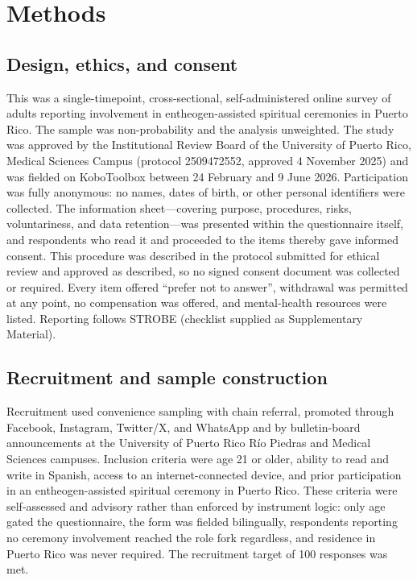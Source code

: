\documentclass[12pt]{article}
\begin{document}
\section{Methods}

\subsection{Design, ethics, and consent}

This was a single-timepoint, cross-sectional, self-administered online survey of adults reporting
involvement in entheogen-assisted spiritual ceremonies in Puerto Rico. The sample was non-probability and
the analysis unweighted. The study was approved by the Institutional Review Board of the University of
Puerto Rico, Medical Sciences Campus (protocol 2509472552, approved 4 November 2025) and was fielded on
KoboToolbox between 24 February and 9 June 2026. Participation was fully anonymous: no names, dates of
birth, or other personal identifiers were collected. The information sheet---covering purpose, procedures,
risks, voluntariness, and data retention---was presented within the questionnaire itself, and respondents
who read it and proceeded to the items thereby gave informed consent. This procedure was described in the
protocol submitted for ethical review and approved as described, so no signed consent document was
collected or required. Every item offered ``prefer not to answer'', withdrawal was permitted at any point,
no compensation was offered, and mental-health resources were listed. Reporting follows STROBE (checklist
supplied as Supplementary Material).

\subsection{Recruitment and sample construction}

Recruitment used convenience sampling with chain referral, promoted through Facebook, Instagram, Twitter/X,
and WhatsApp and by bulletin-board announcements at the University of Puerto Rico R\'io Piedras and Medical
Sciences campuses. Inclusion criteria were age 21 or older, ability to read and write in Spanish, access to
an internet-connected device, and prior participation in an entheogen-assisted spiritual ceremony in Puerto
Rico. These criteria were self-assessed and advisory rather than enforced by instrument logic: only age
gated the questionnaire, the form was fielded bilingually, respondents reporting no ceremony involvement
reached the role fork regardless, and residence in Puerto Rico was never required. The recruitment target
of 100 responses was met.
\end{document}
